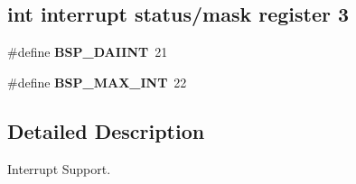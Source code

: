 \subsection*{int interrupt status/mask register 3}
\begin{DoxyCompactItemize}
\item 
\mbox{\label{group__edb7312__interrupt_ga4386456f3f46efe1a11e79e7f217e685}} 
\#define {\bfseries B\+S\+P\+\_\+\+D\+A\+I\+I\+NT}~21
\item 
\mbox{\label{group__edb7312__interrupt_ga33750fa8211ef2e4abe8d852443af594}} 
\#define {\bfseries B\+S\+P\+\_\+\+M\+A\+X\+\_\+\+I\+NT}~22
\end{DoxyCompactItemize}


\subsection{Detailed Description}
Interrupt Support. 

